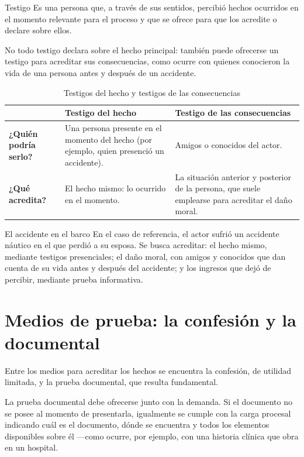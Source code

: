 \documentclass[12pt,oneside]{book}
\begin{document}
\begin{definition}{Testigo}
Es una persona que, a través de sus sentidos, percibió hechos ocurridos en el momento relevante para el proceso y que se ofrece para que los acredite o declare sobre ellos.
\end{definition}

No todo testigo declara sobre el hecho principal: también puede ofrecerse un testigo para acreditar sus consecuencias, como ocurre con quienes conocieron la vida de una persona antes y después de un accidente.

\begin{table}[H]
\centering
\caption{Testigos del hecho y testigos de las consecuencias}
\begin{tabularx}{\textwidth}{>{\raggedright\arraybackslash}p{} X X}
\toprule
 & \textbf{Testigo del hecho} & \textbf{Testigo de las consecuencias} \\
\midrule
\textbf{¿Quién podría serlo?} & Una persona presente en el momento del hecho (por ejemplo, quien presenció un accidente). & Amigos o conocidos del actor. \\
\textbf{¿Qué acredita?} & El hecho mismo: lo ocurrido en el momento. & La situación anterior y posterior de la persona, que suele emplearse para acreditar el daño moral. \\
\bottomrule
\end{tabularx}
\end{table}

\begin{example}{El accidente en el barco}
En el caso de referencia, el actor sufrió un accidente náutico en el que perdió a su esposa. Se busca acreditar: el hecho mismo, mediante testigos presenciales; el daño moral, con amigos y conocidos que dan cuenta de su vida antes y después del accidente; y los ingresos que dejó de percibir, mediante prueba informativa.
\end{example}

\section{Medios de prueba: la confesión y la documental}

Entre los medios para acreditar los hechos se encuentra la confesión, de utilidad limitada, y la prueba documental, que resulta fundamental.

\begin{important}
La prueba documental debe ofrecerse junto con la demanda. Si el documento no se posee al momento de presentarla, igualmente se cumple con la carga procesal indicando cuál es el documento, dónde se encuentra y todos los elementos disponibles sobre él —como ocurre, por ejemplo, con una historia clínica que obra en un hospital.
\end{important}
\end{document}
